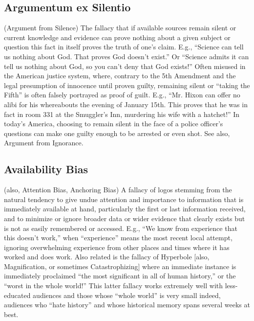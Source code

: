 \documentclass[10pt,a4paper,british]{article}
\begin{document}
\begin{multicols}{2}
	\subsection{Argumentum ex Silentio} (Argument from Silence) The fallacy
	that if available sources remain silent or current knowledge and evidence
	can prove nothing about a given subject or question this fact in itself
	proves the truth of one's claim. E.g., ``Science can tell us nothing about
	God.  That proves God doesn't exist.'' Or ``Science admits it can tell us
	nothing about God, so you can't deny that God exists!'' Often misused in
	the American justice system, where, contrary to the 5th Amendment and the
	legal presumption of innocence until proven guilty,  remaining silent or
	``taking the Fifth'' is often falsely portrayed as proof of guilt. E.g.,
	``Mr. Hixon can offer no alibi for his whereabouts the evening of January
	15th. This proves that he was in fact in room 331 at the Smuggler's Inn,
	murdering his wife with a hatchet!'' In today's America, choosing to remain
	silent in the face of a police officer's questions can make one guilty
	enough to be arrested or even shot. See also, Argument from Ignorance.

	\subsection{Availability Bias} (also, Attention Bias, Anchoring Bias) A
	fallacy of logos stemming from the natural tendency to give undue attention
	and importance to information that is immediately available at hand,
	particularly the first or last information received, and to minimize or
	ignore broader data or wider evidence that clearly exists but is not as
	easily remembered or accessed. E.g., ``We know from experience that this
	doesn't work,'' when ``experience'' means the most recent local attempt,
	ignoring overwhelming experience from other places and times where it has
	worked and does work. Also related is the fallacy of Hyperbole [also,
	Magnification, or sometimes Catastrophizing] where an immediate instance is
	immediately proclaimed ``the most significant in all of human history,'' or
	the ``worst in the whole world!'' This latter fallacy works extremely well
	with less{-}educated audiences and those whose ``whole world'' is very
	small indeed, audiences who ``hate history'' and whose historical memory
	spans several weeks at best.


\end{multicols}
\end{document}
